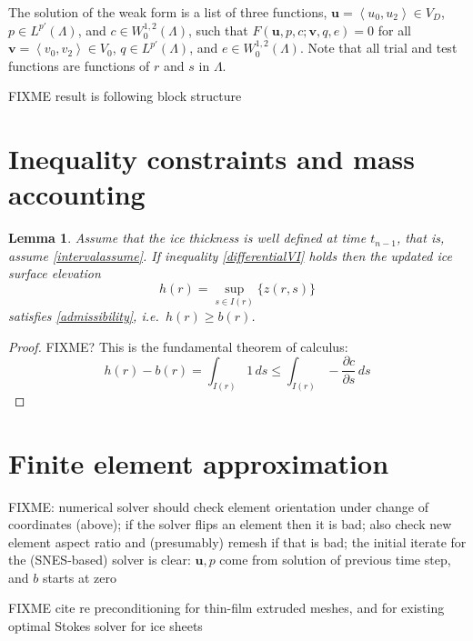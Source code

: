 \documentclass[letterpaper,final,12pt,reqno]{amsart}
\newcommand{\bu}{\mathbf{u}}
\newcommand{\bv}{\mathbf{v}}
\newtheorem{lemma}{Lemma}
\begin{document}
The solution of the weak form is a list of three functions, $\bu = \left<u_0,u_2\right> \in V_D$, $p\in L^{p'}(\Lambda)$, and $c\in W^{1,2}_0(\Lambda)$, such that $F(\bu,p,c;\bv,q,e) = 0$ for all $\bv = \left<v_0,v_2\right> \in V_0$,  $q\in L^{p'}(\Lambda)$, and $e \in W^{1,2}_0(\Lambda)$.  Note that all trial and test functions are functions of $r$ and $s$ in $\Lambda$.

FIXME result is following block structure


\section{Inequality constraints and mass accounting} \label{sec:inequalities}

\begin{lemma}
Assume that the ice thickness is well defined at time $t_{n-1}$, that is, assume
\eqref{intervalassume}.  If inequality \eqref{differentialVI} holds then the updated ice surface elevation
    $$h(r) = \sup_{s\in I(r)}\{z(r,s)\}$$
satisfies \eqref{admissibility}, i.e.~$h(r)\ge b(r)$.
\end{lemma}

\begin{proof}
FIXME? This is the fundamental theorem of calculus:
    $$h(r) - b(r) = \int_{I(r)} 1\,ds \le \int_{I(r)} - \frac{\partial c}{\partial s}\,ds$$
\end{proof}


\section{Finite element approximation}  \label{sec:finiteelement}

FIXME: numerical solver should check element orientation under change of coordinates (above); if the solver flips an element then it is bad; also check new element aspect ratio and (presumably) remesh if that is bad; the initial iterate for the (SNES-based) solver is clear: $\bu,p$ come from solution of previous time step, and $b$ starts at zero

FIXME cite \cite{Tuminaroetal2016} re preconditioning for thin-film extruded meshes, and \cite{IsaacStadlerGhattas2015} for existing optimal Stokes solver for ice sheets


\small

\bigskip


\end{document}
